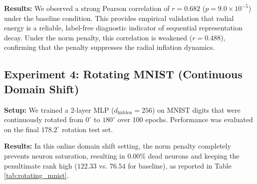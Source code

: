 \documentclass[11pt,a4paper]{article}
\begin{document}
\textbf{Results:} We observed a strong Pearson correlation of $r = 0.682$ ($p = 9.0 \times 10^{-5}$) under the baseline condition. This provides empirical validation that radial energy is a reliable, label-free diagnostic indicator of sequential representation decay. Under the norm penalty, this correlation is weakened ($r = 0.488$), confirming that the penalty suppresses the radial inflation dynamics.

\subsection{Experiment 4: Rotating MNIST (Continuous Domain Shift)}
\textbf{Setup:} We trained a 2-layer MLP ($d_{\text{hidden}}=256$) on MNIST digits that were continuously rotated from $0^\circ$ to $180^\circ$ over 100 epochs. Performance was evaluated on the final $178.2^\circ$ rotation test set.

\textbf{Results:} In this online domain shift setting, the norm penalty completely prevents neuron saturation, resulting in $0.00\%$ dead neurons and keeping the penultimate rank high ($122.33$ vs. $76.54$ for baseline), as reported in Table \ref{tab:rotating_mnist}.

\begin{table}[ht]
\centering
\caption{Rotating MNIST results (2-layer MLP, 100 epochs, 3 seeds).}
\label{tab:rotating_mnist}
\end{table}

\newpage

\end{document}

